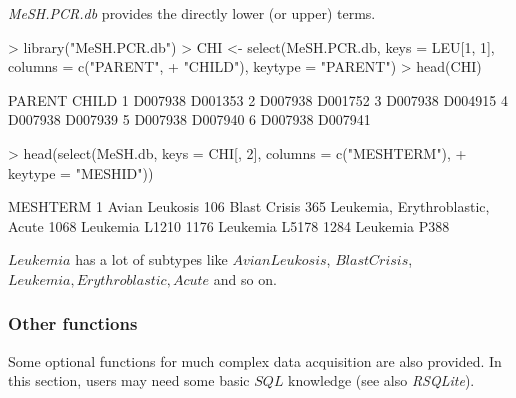 \documentclass[11pt]{article}
\newcommand{\Rpackage}[1]{{\textit{#1}}}
\begin{document}
\Rpackage{MeSH.PCR.db} provides the directly lower (or upper) terms.
\begin{center}
\begin{Schunk}
\begin{Sinput}
> library("MeSH.PCR.db")
> CHI <- select(MeSH.PCR.db, keys = LEU[1, 1], columns = c("PARENT", 
+     "CHILD"), keytype = "PARENT")
> head(CHI)
\end{Sinput}
\begin{Soutput}
   PARENT   CHILD
1 D007938 D001353
2 D007938 D001752
3 D007938 D004915
4 D007938 D007939
5 D007938 D007940
6 D007938 D007941
\end{Soutput}
\begin{Sinput}
> head(select(MeSH.db, keys = CHI[, 2], columns = c("MESHTERM"), 
+     keytype = "MESHID"))
\end{Sinput}
\begin{Soutput}
                            MESHTERM
1                     Avian Leukosis
106                     Blast Crisis
365  Leukemia, Erythroblastic, Acute
1068                  Leukemia L1210
1176                  Leukemia L5178
1284                   Leukemia P388
\end{Soutput}
\end{Schunk}
\end{center}

$Leukemia$ has a lot of subtypes like $Avian Leukosis$, $Blast Crisis$, $Leukemia, Erythroblastic, Acute$ and so on.

\clearpage
\subsubsection{Other functions}
Some optional functions for much complex data acquisition are also provided. In this section, users may need some basic $SQL$ knowledge (see also \Rpackage{RSQLite}).
\end{document}

